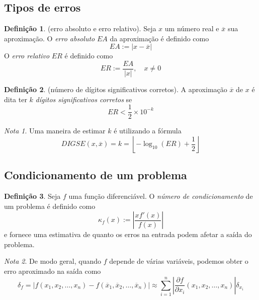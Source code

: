 \documentclass{article}
\theoremstyle{plain}
\theoremstyle{definition}
\newtheorem{defn}{Definição}[section]
\theoremstyle{remark}
\newtheorem*{rem}{Nota}
\begin{document}
\subsection{Tipos de erros}

\begin{defn} (erro absoluto e erro relativo).
    Seja \(x\) um número real e \(\overline{x}\) sua aproximação. O \emph{erro absoluto} \(EA\) da aproximação é definido como
    \begin{equation}
        EA := \vert x - \overline{x} \vert
    \end{equation}
    O \emph{erro relativo} \(ER\) é definido como
    \begin{equation}
        ER := \frac{EA}{\vert x \vert}, \quad x \neq 0
    \end{equation}
\end{defn}

\begin{defn} (número de dígitos significativos corretos).
    A aproximação \(\overline{x}\) de \(x\) é dita ter \(k\) \emph{dígitos significativos corretos} se
    \begin{equation}
        ER < \frac{1}{2} \times 10^{-k}
    \end{equation}
\end{defn}

\begin{rem}
    Uma maneira de estimar \(k\) é utilizando a fórmula
    \begin{equation}
        DIGSE(x, \overline{x}) = k = \left\lfloor -\log_{10}(ER) + \frac{1}{2} \right\rfloor
    \end{equation}
\end{rem}

\subsection{Condicionamento de um problema}

\begin{defn}
    Seja \(f\) uma função diferenciável. O \emph{número de condicionamento} de um problema é definido como
    \begin{equation}
        \kappa_f(x) := \left\vert \frac{xf'(x)}{f(x)} \right\vert
    \end{equation}
    \noindent e fornece uma estimativa de quanto os erros na entrada podem afetar a saída do problema.
\end{defn}

\begin{rem}
    De modo geral, quando \(f\) depende de várias variáveis, podemos obter o erro aproximado na saída como
    \begin{equation}
        \delta_f = \vert f(x_1, x_2, \ldots, x_n) - f(\overline{x}_1, \overline{x}_2, \ldots, \overline{x}_n) \vert \approx \sum_{i=1}^{n} \left\vert \frac{\partial f}{\partial x_i} (x_1, x_2, \ldots, x_n)\right\vert \delta_{x_i}
    \end{equation}
\end{rem}
\end{document}
